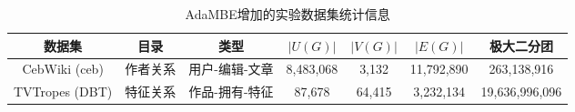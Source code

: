 \begin{table} [t]
	\centering    
	\setlength{\abovecaptionskip}{0cm}  
  \setlength{\belowcaptionskip}{-0.2cm}
	\caption{AdaMBE增加的实验数据集统计信息}      
	\label{tbl:ada_datasets}
	\setlength{\tabcolsep}{1pt}
	\begin{center}
				\normalsize{
		\begin{tabular}{|c|c|c|c|c|c|c|}
			\hline 
			\textbf{数据集} &\textbf{目录} &\textbf{类型} & \textbf{$|U(G)|$} & \textbf{$|V(G)|$} & \textbf{$|E(G)|$} &\textbf{极大二分团}\\
			\hline
      CebWiki (ceb) & 作者关系 & 用户-编辑-文章 & 8,483,068 & 3,132 & 11,792,890 & 263,138,916\\
			TVTropes (DBT) & 特征关系 & 作品-拥有-特征 & 87,678 & 64,415 & 3,232,134 & 19,636,996,096 \\ 

\end{tabular}}
\end{center}
\end{table}
